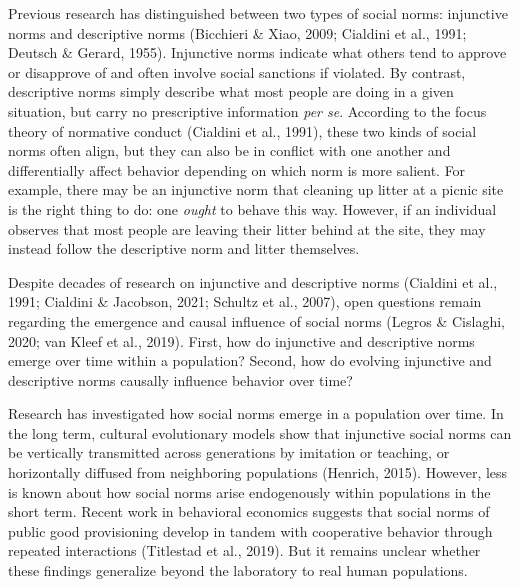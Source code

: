 \documentclass[
  man, donotrepeattitle,mask,floatsintext]{apa6}
\begin{document}
Previous research has distinguished between two types of social norms: injunctive norms and descriptive norms (Bicchieri \& Xiao, 2009; Cialdini et al., 1991; Deutsch \& Gerard, 1955). Injunctive norms indicate what others tend to approve or disapprove of and often involve social sanctions if violated. By contrast, descriptive norms simply describe what most people are doing in a given situation, but carry no prescriptive information \emph{per se}. According to the focus theory of normative conduct (Cialdini et al., 1991), these two kinds of social norms often align, but they can also be in conflict with one another and differentially affect behavior depending on which norm is more salient. For example, there may be an injunctive norm that cleaning up litter at a picnic site is the right thing to do: one \emph{ought} to behave this way. However, if an individual observes that most people are leaving their litter behind at the site, they may instead follow the descriptive norm and litter themselves.

Despite decades of research on injunctive and descriptive norms (Cialdini et al., 1991; Cialdini \& Jacobson, 2021; Schultz et al., 2007), open questions remain regarding the emergence and causal influence of social norms (Legros \& Cislaghi, 2020; van Kleef et al., 2019). First, how do injunctive and descriptive norms emerge over time within a population? Second, how do evolving injunctive and descriptive norms causally influence behavior over time?

Research has investigated how social norms emerge in a population over time. In the long term, cultural evolutionary models show that injunctive social norms can be vertically transmitted across generations by imitation or teaching, or horizontally diffused from neighboring populations (Henrich, 2015). However, less is known about how social norms arise endogenously within populations in the short term. Recent work in behavioral economics suggests that social norms of public good provisioning develop in tandem with cooperative behavior through repeated interactions (Titlestad et al., 2019). But it remains unclear whether these findings generalize beyond the laboratory to real human populations.
\end{document}
